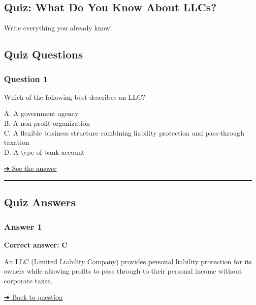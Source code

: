 
\subsection{Quiz: What Do You Know About
LLCs?}\label{quiz-what-do-you-know-about-llcs}

Write everything you already know!

\subsection{Quiz Questions}\label{quiz-questions}

\subsubsection{Question 1}\label{question-1}

Which of the following best describes an LLC?

A. A government agency\\
B. A non-profit organization\\
C. A flexible business structure combining liability protection and
pass-through taxation\\
D. A type of bank account

\hyperref[answer-1]{➔ See the answer}

\begin{center}\rule{0.5\linewidth}{0.5pt}\end{center}

\subsection{Quiz Answers}\label{quiz-answers}

\subsubsection{Answer 1}\label{answer-1}

\textbf{Correct answer: C}

An LLC (Limited Liability Company) provides personal liability
protection for its owners while allowing profits to pass through to
their personal income without corporate taxes.

\hyperref[question-1]{➔ Back to question}
